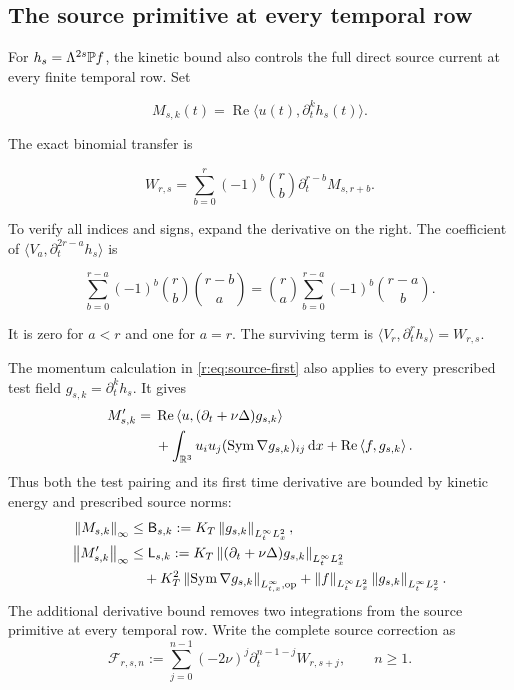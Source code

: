 \subsection{The source primitive at every temporal row}
\label{r:sec:all-row-primitives}

For \(h_s=\Lambda^{2s}\mathbb P f\), the kinetic bound also controls
the full direct source current at every finite temporal row.
Set

\[
M_{s,k}(t)=\operatorname{Re}\langle u(t),\partial_t^kh_s(t)\rangle.
\]

The exact binomial transfer is

\[
W_{r,s}
=\sum_{b=0}^r(-1)^b\binom rb
\partial_t^{r-b}M_{s,r+b}.
\]

To verify all indices and signs, expand the derivative on the right. The coefficient of
$\langle V_a,\partial_t^{2r-a}h_s\rangle$ is

\[
\sum_{b=0}^{r-a}(-1)^b\binom rb\binom{r-b}{a}
=\binom ra\sum_{b=0}^{r-a}(-1)^b\binom{r-a}{b}.
\]

It is zero for $a<r$ and one for $a=r$. The surviving term is
$\langle V_r,\partial_t^rh_s\rangle=W_{r,s}$.

The momentum calculation in \eqref{r:eq:source-first} also applies to
every prescribed test field \(g_{s,k}=\partial_t^kh_s\). It gives
\begin{equation}
\begin{aligned}
 M_{s,k}'={}&\operatorname{Re}\left\langle u,(\partial_t+\nu\Delta)g_{s,k}\right\rangle\\
 &+\int_{\mathbb R^3}u_i u_j(\operatorname{Sym}\nabla g_{s,k})_{ij}\,\mathrm d x
 +\operatorname{Re}\left\langle f,g_{s,k}\right\rangle.
 \label{r:eq:all-row-test-derivative}
\end{aligned}
\end{equation}
Thus both the test pairing and its first time derivative are bounded
by kinetic energy and prescribed source norms:
\begin{equation}
\begin{aligned}
 \left\lVert M_{s,k}\right\rVert_\infty&\le\mathsf B_{s,k}
 :=K_T\left\lVert g_{s,k}\right\rVert_{L^\infty_tL^2_x},\\
 \left\lVert M_{s,k}'\right\rVert_\infty&\le\mathsf L_{s,k}
 :=K_T\left\lVert (\partial_t+\nu\Delta)g_{s,k}\right\rVert_{L^\infty_tL^2_x}\\
 &\quad+K_T^2\left\lVert \operatorname{Sym}\nabla g_{s,k}\right\rVert_{L^\infty_{t,x},\mathrm{op}}
 +\left\lVert f\right\rVert_{L^\infty_tL^2_x}\left\lVert g_{s,k}\right\rVert_{L^\infty_tL^2_x}.
 \label{r:eq:all-row-test-bounds}
\end{aligned}
\end{equation}
The additional derivative bound removes two integrations from the
source primitive at every temporal row. Write the complete source
correction as
\[
 \mathcal F_{r,s,n}:=\sum_{j=0}^{n-1}(-2\nu)^j
 \partial_t^{n-1-j}W_{r,s+j},\qquad n\ge1.
\]

